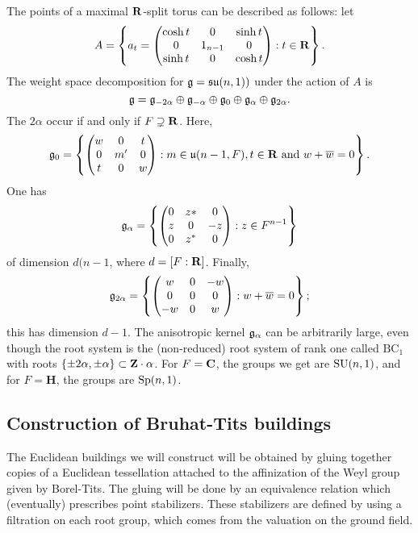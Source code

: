 The points of a maximal $\mathbf{R}$-split torus can be described as follows: let 
\[
  A = \left\{a_t = \begin{pmatrix} \cosh t & 0 & \sinh t \\0 & 1_{n-1} & 0\\ \sinh t & 0& \cosh t \end{pmatrix} : t\in \mathbf{R}\right\} .
\]
The weight space decomposition for $\mathfrak{g}=\mathfrak{su}(n,1))$ under the action 
of $A$ is 
\[
  \mathfrak{g} = \mathfrak{g}_{-2\alpha} \oplus \mathfrak{g}_{-\alpha} \oplus \mathfrak{g}_0 \oplus \mathfrak{g}_\alpha \oplus \mathfrak{g}_{2\alpha} .
\]
The $2\alpha$ occur if and only if $F\supsetneq \mathbf{R}$. Here, 
\[
  \mathfrak{g}_0 = \left\{\begin{pmatrix} w & 0 & t \\ 0 & m'& 0 \\ t & 0 & w \end{pmatrix}:m\in \mathfrak{u}(n-1,F),t\in \mathbf{R}\text{ and }w+\overline w=0\right\} .
\]
One has 
\[
  \mathfrak{g}_\alpha = \left\{\begin{pmatrix} 0 & z\ast & 0 \\ z & 0 & -z \\ 0 & z^\ast & 0 \end{pmatrix} :z\in F^{n-1} \right\} 
\]
of dimension $d(n-1$, where $d=[F:\mathbf{R}]$. Finally, 
\[
  \mathfrak{g}_{2\alpha} = \left\{\begin{pmatrix} w & 0 & -w \\ 0 & 0 & 0 \\ -w & 0 & w \end{pmatrix} : w+\overline w =0\right\} ;
\]
this has dimension $d-1$. The anisotropic kernel $\mathfrak{g}_\alpha$ can be arbitrarily 
large, even though the root system is the (non-reduced) root system of rank 
one called $\mathrm{BC}_1$ with roots 
$\{\pm 2\alpha,\pm \alpha\}\subset \mathbf{Z}\cdot \alpha$. For 
$F=\mathbf{C}$, the groups we get are $\operatorname{SU}(n,1)$, and for 
$F=\mathbf H$, the groups are $\operatorname{Sp}(n,1)$. 





\subsection{Construction of Bruhat-Tits buildings}

The Euclidean buildings we will construct will be obtained by gluing together 
copies of a Euclidean tessellation attached to the affinization of the Weyl 
group given by Borel-Tits. The gluing will be done by an equivalence relation 
which (eventually) prescribes point stabilizers. These stabilizers are defined 
by using a filtration on each root group, which comes from the valuation on the 
ground field. 


